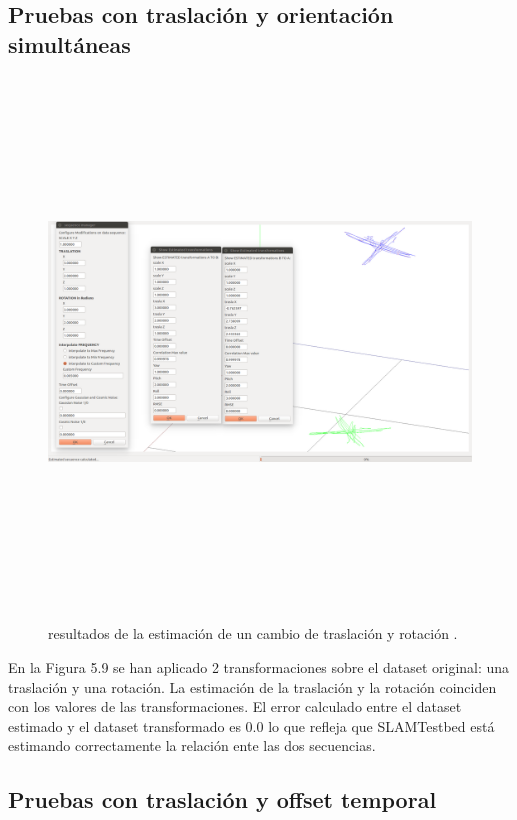 \subsection{Pruebas con traslación y orientación simultáneas}
\begin{figure}[H]
\begin{center}
\label{fig:opciones de View}\includegraphics[height=14.0cm,width=18.0cm]{img/cap6/Trasla_Rota_abba.png}
\hspace{0.5cm}

\end{center}

\caption{ resultados de la estimación de un cambio de traslación y rotación .}
\end{figure}

En la Figura 5.9 se han aplicado 2 transformaciones sobre el dataset original: una traslación y una rotación.
La estimación de la traslación y la rotación coinciden con los valores de las transformaciones. El error calculado entre el dataset estimado y el dataset transformado es 0.0 lo que refleja que SLAMTestbed está estimando correctamente la relación ente las dos secuencias.

\subsection{Pruebas con traslación y offset temporal}

